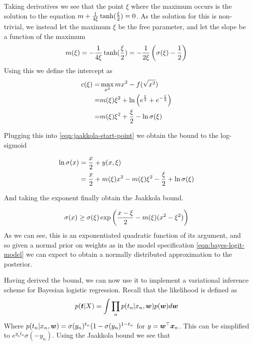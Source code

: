 Taking derivatives we see that the point $\xi$ where the maximum occurs is the solution to the equation $m + \frac{1}{4 \xi} \tanh (\frac{\xi}{2}) = 0$. As the solution for this is non-trivial, we instead let the maximum $\xi$ be the free parameter, and let the slope be a function of the maximum
\begin{align}
m(\xi) = -\frac{1}{4\xi} \tanh (\frac{\xi}{2}) = -\frac{1}{2\xi} \left(\sigma(\xi) - \frac{1}{2}\right)
\end{align}
Using this we define the intercept as
\begin{align}
\begin{split}
c(\xi) = & \max_{x^2} mx^2 - f(\sqrt{x^2}) \\
 = & m(\xi)\xi^2 + \ln \left(e^{\frac{\xi}{2}} + e^{-\frac{\xi}{2}} \right) \\
 = & m(\xi)\xi^2 + \frac{\xi}{2} - \ln \sigma (\xi)
\end{split}
\end{align}


Plugging this into \eqref{eqn:jaakkola-start-point} we obtain the bound to the log-sigmoid

\begin{align}
\begin{split}
\ln \sigma(x) & = \frac{x}{2} + y(x, \xi) \\
 & = \frac{x}{2} + m(\xi)x^2 - m(\xi)\xi^2 - \frac{\xi}{2} + \ln \sigma(\xi)
\end{split}
\end{align}

And taking the exponent finally obtain the Jaakkola\cite{Jaakkola1997} bound.

\begin{align}
\sigma(x) \geq \sigma(\xi)\exp \left(\frac{x - \xi}{2} - m(\xi)(x^2 - \xi^2) \right)
\end{align}
As we can see, this is an exponentiated quadratic function of its argument, and so given a normal prior on weights as in the model specification \eqref{eqn:bayes-logit-model} we can expect to obtain a normally distributed approximation to the posterior.

Having derived the bound, we can now use it to implement a variational inference scheme for Bayesian logistic regression. Recall that the likelihood is defined as
\begin{align}
p(\bm t|X) = \int \prod_n p(t_n | x_n, \bm w) p(\bm w) d\bm w
\end{align}
Where $p(t_n | x_n, \bm w) = \sigma(y_n)^{t_n}(1- \sigma(y_n)^{1-t_n}$ for $y = \bm w^\top\bm x_n$. This can be simplified to $e^{y_n t_n}\sigma(-y_n)$. Using the Jaakkola bound we see that

